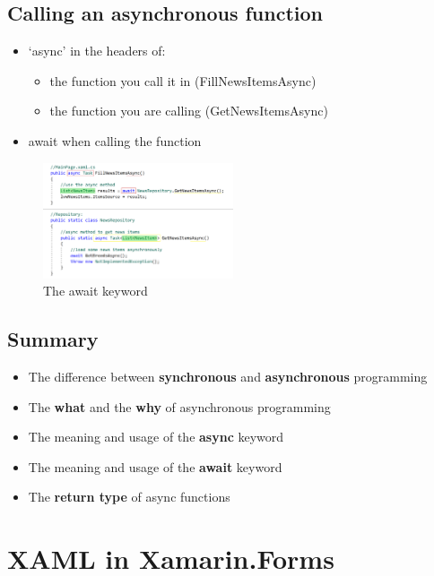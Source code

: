 \documentclass{article}
\newcommand{\bold}[1]{\textbf{#1}}
\begin{document}
\subsection{Calling an asynchronous function}

\begin{itemize}
    \item `async' in the headers of:
    \begin{itemize}
        \item the function you call it in (FillNewsItemsAsync)
        \item the function you are calling (GetNewsItemsAsync)
    \end{itemize}
    \item await when calling the function
\end{itemize}

\begin{figure}[H]
    \centering
    \includegraphics[width=0.5\textwidth]{async-calling.png}
    \caption{The await keyword}
\end{figure}

\subsection{Summary}
\begin{itemize}
    \item The difference between \bold{synchronous} and \bold{asynchronous} programming
    \item The \bold{what} and the \bold{why} of asynchronous programming
    \item The meaning and usage of the \bold{async} keyword
    \item The meaning and usage of the \bold{await} keyword
    \item The \bold{return type} of async functions
\end{itemize}

\section{XAML in Xamarin.Forms}
\end{document}
